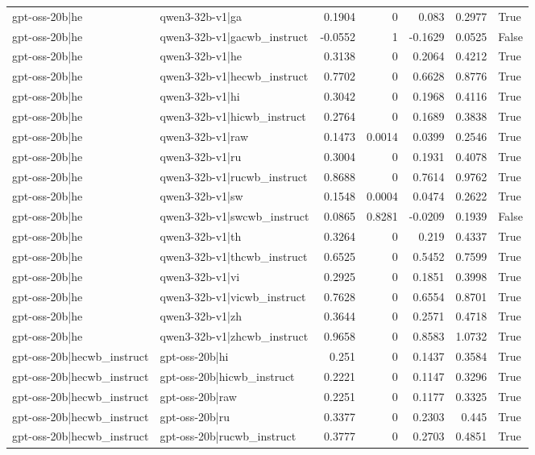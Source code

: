 \begin{table}
\begin{tabular}{l l r r r r l}
gpt-oss-20b|he & qwen3-32b-v1|ga & 0.1904 & 0 & 0.083 & 0.2977 & True \\
gpt-oss-20b|he & qwen3-32b-v1|gacwb_instruct & -0.0552 & 1 & -0.1629 & 0.0525 & False \\
gpt-oss-20b|he & qwen3-32b-v1|he & 0.3138 & 0 & 0.2064 & 0.4212 & True \\
gpt-oss-20b|he & qwen3-32b-v1|hecwb_instruct & 0.7702 & 0 & 0.6628 & 0.8776 & True \\
gpt-oss-20b|he & qwen3-32b-v1|hi & 0.3042 & 0 & 0.1968 & 0.4116 & True \\
gpt-oss-20b|he & qwen3-32b-v1|hicwb_instruct & 0.2764 & 0 & 0.1689 & 0.3838 & True \\
gpt-oss-20b|he & qwen3-32b-v1|raw & 0.1473 & 0.0014 & 0.0399 & 0.2546 & True \\
gpt-oss-20b|he & qwen3-32b-v1|ru & 0.3004 & 0 & 0.1931 & 0.4078 & True \\
gpt-oss-20b|he & qwen3-32b-v1|rucwb_instruct & 0.8688 & 0 & 0.7614 & 0.9762 & True \\
gpt-oss-20b|he & qwen3-32b-v1|sw & 0.1548 & 0.0004 & 0.0474 & 0.2622 & True \\
gpt-oss-20b|he & qwen3-32b-v1|swcwb_instruct & 0.0865 & 0.8281 & -0.0209 & 0.1939 & False \\
gpt-oss-20b|he & qwen3-32b-v1|th & 0.3264 & 0 & 0.219 & 0.4337 & True \\
gpt-oss-20b|he & qwen3-32b-v1|thcwb_instruct & 0.6525 & 0 & 0.5452 & 0.7599 & True \\
gpt-oss-20b|he & qwen3-32b-v1|vi & 0.2925 & 0 & 0.1851 & 0.3998 & True \\
gpt-oss-20b|he & qwen3-32b-v1|vicwb_instruct & 0.7628 & 0 & 0.6554 & 0.8701 & True \\
gpt-oss-20b|he & qwen3-32b-v1|zh & 0.3644 & 0 & 0.2571 & 0.4718 & True \\
gpt-oss-20b|he & qwen3-32b-v1|zhcwb_instruct & 0.9658 & 0 & 0.8583 & 1.0732 & True \\
gpt-oss-20b|hecwb_instruct & gpt-oss-20b|hi & 0.251 & 0 & 0.1437 & 0.3584 & True \\
gpt-oss-20b|hecwb_instruct & gpt-oss-20b|hicwb_instruct & 0.2221 & 0 & 0.1147 & 0.3296 & True \\
gpt-oss-20b|hecwb_instruct & gpt-oss-20b|raw & 0.2251 & 0 & 0.1177 & 0.3325 & True \\
gpt-oss-20b|hecwb_instruct & gpt-oss-20b|ru & 0.3377 & 0 & 0.2303 & 0.445 & True \\
gpt-oss-20b|hecwb_instruct & gpt-oss-20b|rucwb_instruct & 0.3777 & 0 & 0.2703 & 0.4851 & True \\

\end{tabular}
\end{table}
